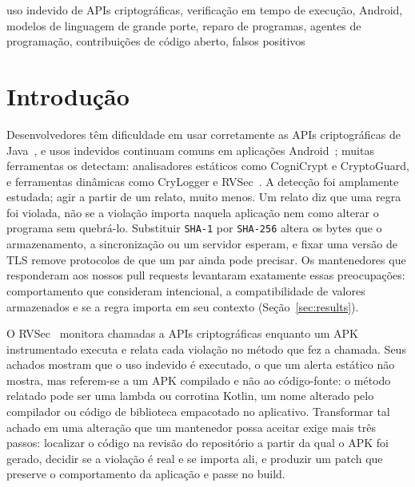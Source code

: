 \documentclass[conference]{IEEEtran}
\begin{document}
\begin{IEEEkeywords}
uso indevido de APIs criptográficas, verificação em tempo de execução, Android, modelos de linguagem
de grande porte, reparo de programas, agentes de programação, contribuições de código aberto, falsos
positivos
\end{IEEEkeywords}

\section{Introdução}
\label{sec:introduction}

Desenvolvedores têm dificuldade em usar corretamente as APIs criptográficas
de Java~\cite{nadi2016hoops}, e usos indevidos continuam comuns em aplicações
Android~\cite{egele2013crypto,costa2026rv4android}; muitas ferramentas os
detectam: analisadores estáticos como CogniCrypt e CryptoGuard, e ferramentas dinâmicas
como CryLogger e RVSec~\cite{krueger2017cognicrypt,krueger2021crysl,
rahaman2019cryptoguard,piccolboni2021crylogger,torres2023runtime}. A detecção foi
amplamente estudada; agir a partir de um relato, muito menos. Um relato diz que uma
regra foi violada, não se a violação importa naquela aplicação nem como
alterar o programa sem quebrá-lo. Substituir \texttt{SHA-1} por
\texttt{SHA-256} altera os bytes que o armazenamento, a sincronização ou um servidor
esperam, e fixar uma versão de TLS remove protocolos de que um par ainda pode precisar. Os
mantenedores que responderam aos nossos pull requests levantaram exatamente essas preocupações:
comportamento que consideram intencional, a compatibilidade de valores armazenados e
se a regra importa em seu contexto (Seção~\ref{sec:results}).

O RVSec~\cite{torres2023runtime,costa2026rv4android} monitora chamadas a APIs criptográficas enquanto um
APK instrumentado executa e relata cada violação no método que fez a
chamada. Seus achados mostram que o uso indevido é executado, o que um alerta estático não
mostra, mas referem-se a um APK compilado e não ao código-fonte: o método
relatado pode ser uma lambda ou corrotina Kotlin, um nome alterado pelo compilador ou
código de biblioteca empacotado no aplicativo. Transformar tal achado em uma alteração que um
mantenedor possa aceitar exige mais três passos: localizar o código na
revisão do repositório a partir da qual o APK foi gerado, decidir se a violação é
real e se importa ali, e produzir um patch que preserve o comportamento da aplicação
e passe no build.
\end{document}
